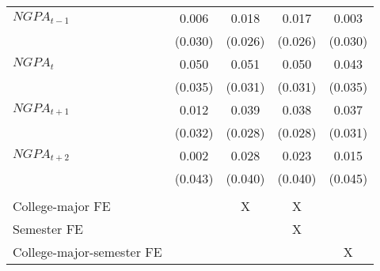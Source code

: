 {{\begin{tabular}{lccc|>{\columncolor[gray]{0.8}}c}
\hspace{3mm}$NGPA_{t-1}$            &       0.006   &       0.018   &       0.017   &       0.003   \\
                    &     (0.030)   &     (0.026)   &     (0.026)   &     (0.030)   \\
 
\hspace{3mm}$NGPA_{t}$              &       0.050   &       0.051   &       0.050   &       0.043   \\
                    &     (0.035)   &     (0.031)   &     (0.031)   &     (0.035)   \\
 
\hspace{3mm}$NGPA_{t+1}$            &       0.012   &       0.039   &       0.038   &       0.037   \\
                    &     (0.032)   &     (0.028)   &     (0.028)   &     (0.031)   \\
 
\hspace{3mm}$NGPA_{t+2}$            &       0.002   &       0.028   &       0.023   &       0.015   \\
                    &     (0.043)   &     (0.040)   &     (0.040)   &     (0.045)   \\
&  &  &  &   \\  \hline 
 College-major FE                       &  & X   & X &   \\
 Semester FE                            &  &     & X &   \\
 College-major-semester FE              &  &     &   & X \\

\bottomrule
\end{tabular}
}
}

